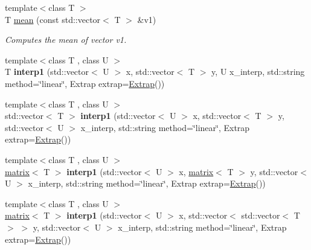 \begin{DoxyCompactItemize}
\item 
\hypertarget{namespacekeycpp_ad1acd03db6a49523cb5dbe751a80917a}{{\footnotesize template$<$class T $>$ }\\T \hyperlink{namespacekeycpp_ad1acd03db6a49523cb5dbe751a80917a}{mean} (const std\-::vector$<$ T $>$ \&v1)}\label{namespacekeycpp_ad1acd03db6a49523cb5dbe751a80917a}

\begin{DoxyCompactList}\small\item\em Computes the mean of vector v1. \end{DoxyCompactList}\item 
\hypertarget{namespacekeycpp_a123211086c4953fe9346acc22b2a67f9}{{\footnotesize template$<$class T , class U $>$ }\\T {\bfseries interp1} (std\-::vector$<$ U $>$ x, std\-::vector$<$ T $>$ y, U x\-\_\-interp, std\-::string method=\char`\"{}linear\char`\"{}, Extrap extrap=\hyperlink{classkeycpp_1_1_extrap}{Extrap}())}\label{namespacekeycpp_a123211086c4953fe9346acc22b2a67f9}

\item 
\hypertarget{namespacekeycpp_a56633eb0878a0dbe6596fb0e74fdc6ea}{{\footnotesize template$<$class T , class U $>$ }\\std\-::vector$<$ T $>$ {\bfseries interp1} (std\-::vector$<$ U $>$ x, std\-::vector$<$ T $>$ y, std\-::vector$<$ U $>$ x\-\_\-interp, std\-::string method=\char`\"{}linear\char`\"{}, Extrap extrap=\hyperlink{classkeycpp_1_1_extrap}{Extrap}())}\label{namespacekeycpp_a56633eb0878a0dbe6596fb0e74fdc6ea}

\item 
\hypertarget{namespacekeycpp_ad6dfc562f4ab516d21be63ab8a9c1b23}{{\footnotesize template$<$class T , class U $>$ }\\\hyperlink{classkeycpp_1_1matrix}{matrix}$<$ T $>$ {\bfseries interp1} (std\-::vector$<$ U $>$ x, \hyperlink{classkeycpp_1_1matrix}{matrix}$<$ T $>$ y, std\-::vector$<$ U $>$ x\-\_\-interp, std\-::string method=\char`\"{}linear\char`\"{}, Extrap extrap=\hyperlink{classkeycpp_1_1_extrap}{Extrap}())}\label{namespacekeycpp_ad6dfc562f4ab516d21be63ab8a9c1b23}

\item 
\hypertarget{namespacekeycpp_a3b44770c6a8c5ba4acb6fe6ead6cc811}{{\footnotesize template$<$class T , class U $>$ }\\\hyperlink{classkeycpp_1_1matrix}{matrix}$<$ T $>$ {\bfseries interp1} (std\-::vector$<$ U $>$ x, std\-::vector$<$ std\-::vector$<$ T $>$ $>$ y, std\-::vector$<$ U $>$ x\-\_\-interp, std\-::string method=\char`\"{}linear\char`\"{}, Extrap extrap=\hyperlink{classkeycpp_1_1_extrap}{Extrap}())}\label{namespacekeycpp_a3b44770c6a8c5ba4acb6fe6ead6cc811}


\end{DoxyCompactItemize}
